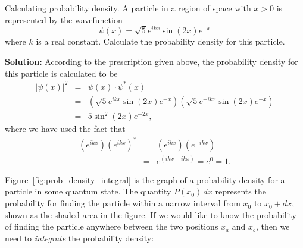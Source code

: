 \begin{example}{Calculating probability density.}
\label{exam:CalcProbDensity}
A particle in a region of space with $x > 0$ is represented by 
the wavefunction
\begin{equation}
\psi(x) = \sqrt{5} e^{ikx} \sin(2x) e^{-x} \nonumber
\end{equation}
where $k$ is a real constant.  Calculate the probability
density for this particle.

{\bf Solution:} According to the prescription given above, the
probability density for this particle is calculated to be
\begin{eqnarray}
\left| \psi(x) \right| ^2 
   & = & \psi(x) \cdot \psi^*(x) \nonumber \\
   & = & \left( \sqrt{5} e^{ikx} \sin(2x) e^{-x} \right) 
         \left( \sqrt{5} e^{-ikx} \sin(2x) e^{-x} \right) \nonumber \\
   & = & 5 \sin^2(2x) e^{-2x}, \nonumber
\end{eqnarray}
where we have used the fact that
\begin{eqnarray}
(e^{ikx}) (e^{ikx})^* &=& (e^{ikx}) (e^{-ikx}) \nonumber \\
                      &=& e^{(ikx-ikx)} = e^0 = 1. \nonumber
\end{eqnarray}


\end{example}

Figure~\ref{fig:prob_density_integral} is the graph of a probability
density for a particle in some quantum state.  The quantity $
P(x_0)\, dx$ represents the probability for finding the particle within a
narrow interval from $x_0$ to $x_0+dx$, shown as the shaded area
in the figure.  If we would like to know the probability of finding
the particle anywhere between the two positions $x_a$ and $x_b$, then
we need to {\em integrate} the probability density:

